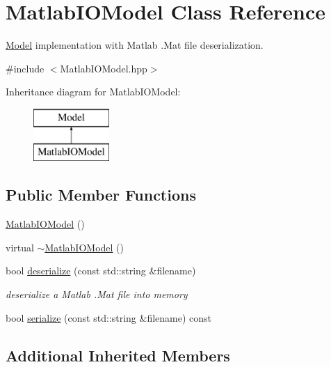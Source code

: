 \hypertarget{class_matlab_i_o_model}{\section{Matlab\-I\-O\-Model Class Reference}
\label{class_matlab_i_o_model}
}


\hyperlink{class_model}{Model} implementation with Matlab .Mat file deserialization.  




{\ttfamily \#include $<$Matlab\-I\-O\-Model.\-hpp$>$}

Inheritance diagram for Matlab\-I\-O\-Model\-:\begin{figure}[H]
\begin{center}
\leavevmode
\includegraphics[height=2.000000cm]{class_matlab_i_o_model}
\end{center}
\end{figure}
\subsection*{Public Member Functions}
\begin{DoxyCompactItemize}
\item 
\hyperlink{class_matlab_i_o_model_ac4e387c6665a094f985b0ca0c37b1aee}{Matlab\-I\-O\-Model} ()
\item 
virtual \hyperlink{class_matlab_i_o_model_ac47ddec68b26241297c266b248c856d6}{$\sim$\-Matlab\-I\-O\-Model} ()
\item 
bool \hyperlink{class_matlab_i_o_model_a223538821bf7944a26433f7f99017f8b}{deserialize} (const std\-::string \&filename)
\begin{DoxyCompactList}\small\item\em deserialize a Matlab .Mat file into memory \end{DoxyCompactList}\item 
bool \hyperlink{class_matlab_i_o_model_ad67a1237af4a4e4d736599e6f2474252}{serialize} (const std\-::string \&filename) const 
\end{DoxyCompactItemize}
\subsection*{Additional Inherited Members}


